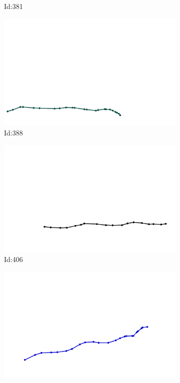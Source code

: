 \documentclass[12pt,twoside]{report}
\begin{document}
\begin{figure}
\begin{subfigure}[b]{0.20\textwidth}
\caption{Id:381}
\end{subfigure}
\begin{subfigure}[b]{0.20\textwidth}
\centering
\includegraphics[width=\textwidth]{../trajectories/388.png}
\caption{Id:388}
\end{subfigure}
\begin{subfigure}[b]{0.20\textwidth}
\centering
\includegraphics[width=\textwidth]{../trajectories/406.png}
\caption{Id:406}
\end{subfigure}
\begin{subfigure}[b]{0.20\textwidth}
\centering
\includegraphics[width=\textwidth]{../trajectories/438.png}

\end{subfigure}
\end{figure}
\end{document}
